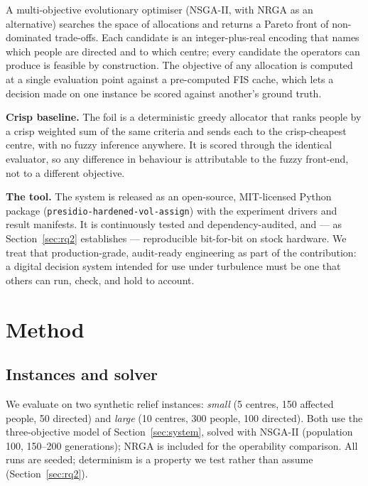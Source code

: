 \documentclass[systems,article,submit,moreauthors,pdftex]{Definitions/mdpi}
\begin{document}
A multi-objective evolutionary optimiser (NSGA-II, with NRGA as an alternative) searches the
space of allocations and returns a Pareto front of non-dominated trade-offs. Each candidate
is an integer-plus-real encoding that names which people are directed and to which centre;
every candidate the operators can produce is feasible by construction. The objective of any
allocation is computed at a single evaluation point against a pre-computed FIS cache, which
lets a decision made on one instance be scored against another's ground truth.

\textbf{Crisp baseline.} The foil is a deterministic greedy allocator that ranks people by a
crisp weighted sum of the same criteria and sends each to the crisp-cheapest centre, with no
fuzzy inference anywhere. It is scored through the identical evaluator, so any difference in
behaviour is attributable to the fuzzy front-end, not to a different objective.

\textbf{The tool.} The system is released as an open-source, MIT-licensed Python package
(\texttt{presidio-hardened-vol-assign}) with the experiment drivers and result manifests. It
is continuously tested and dependency-audited, and --- as Section~\ref{sec:rq2} establishes
--- reproducible bit-for-bit on stock hardware. We treat that production-grade,
audit-ready engineering as part of the contribution: a digital decision system intended for
use under turbulence must be one that others can run, check, and hold to account.

\section{Method}\label{sec:method}

\subsection{Instances and solver}\label{sec:method-setup}
We evaluate on two synthetic relief instances: \emph{small} (5 centres, 150 affected people,
50 directed) and \emph{large} (10 centres, 300 people, 100 directed). Both use the
three-objective model of Section~\ref{sec:system}, solved with NSGA-II (population 100,
150--200 generations); NRGA is included for the operability comparison. All runs are seeded;
determinism is a property we test rather than assume (Section~\ref{sec:rq2}).
\end{document}
